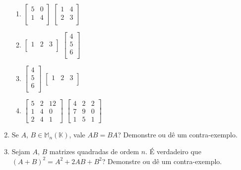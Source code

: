 \documentclass[oneside,a4paper,12pt]{article}
\begin{document}
\begin{enumerate}
\begin{multicols}{2}
\begin{enumerate}
		\item 
		$ \left[
		\begin{array}{cc}
		5	&	0	\\
		1	&	4	\\
		\end{array}
		\right]$
		$ \left[
		\begin{array}{cc}
		1	&	4	\\
		2	&	3	\\
		\end{array}
		\right]$
		
		\item 
		$ \left[
		\begin{array}{ccc}
		1	&	2	&	3	\\
		\end{array}
		\right]$
		$ \left[
		\begin{array}{c}
		4	\\
		5	\\
		6	\\
		\end{array}
		\right]$
		
		\item 
		$ \left[
		\begin{array}{c}
		4	\\
		5	\\
		6	\\
		\end{array}
		\right]$
		$ \left[
		\begin{array}{ccc}
		1	&	2	&	3	\\
		\end{array}
		\right]$

		\item 		$ \left[
		\begin{array}{ccc}
		5	&	2	&	12	\\
		1	&	4	&	0	\\
		2	&	4	&	1
		\end{array}
		\right]$
		$ \left[
		\begin{array}{ccc}
		4	&	2	&	2	\\
		7	&	9	&	0	\\
		1	&	5	&	1
		\end{array}
		\right]$
	\end{enumerate}
	\end{multicols}
	
	\item Se $A$, $B \in \mathbb{M}_{n}(\mathbb{K})$, vale $AB = BA$? Demonstre ou dê um contra-exemplo.
	
	\item Sejam $A$, $B$ matrizes quadradas de ordem $n$. É verdadeiro que $(A + B)^2 = A^2 + 2AB + B^2$? Demonstre ou dê um contra-exemplo.
	

\end{enumerate}
\end{document}
